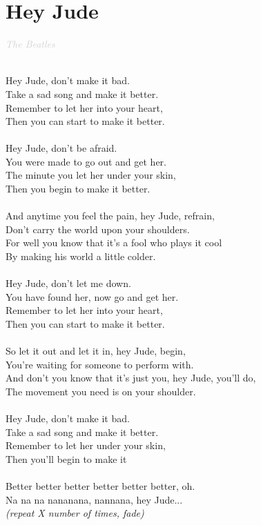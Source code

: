 \documentclass[a5paper, 10pt]{book}
\begin{document}
\section{Hey Jude}\textcolor{lightgray}{\textit{The Beatles}}\\~\\
\begin{minipage}[t]{0.8\textwidth}
Hey Jude, don't make it bad.\\
Take a sad song and make it better.\\
Remember to let her into your heart,\\
Then you can start to make it better.\\
\\
Hey Jude, don't be afraid.\\
You were made to go out and get her.\\
The minute you let her under your skin,\\
Then you begin to make it better.\\
\\
\hspace*{4mm}And anytime you feel the pain, hey Jude, refrain,\\
\hspace*{4mm}Don't carry the world upon your shoulders.\\
\hspace*{4mm}For well you know that it's a fool who plays it cool\\
\hspace*{4mm}By making his world a little colder.\\
\\
Hey Jude, don't let me down.\\
You have found her, now go and get her.\\
Remember to let her into your heart,\\
Then you can start to make it better.\\
\\
\hspace*{4mm}So let it out and let it in, hey Jude, begin,\\
\hspace*{4mm}You're waiting for someone to perform with.\\
\hspace*{4mm}And don't you know that it's just you, hey Jude, you'll do,\\
\hspace*{4mm}The movement you need is on your shoulder.\\
\\
Hey Jude, don't make it bad.\\
Take a sad song and make it better.\\
Remember to let her under your skin,\\
Then you'll begin to make it\\
\\
Better better better better better better, oh.\\
Na na na nananana, nannana, hey Jude...\\
\hspace*{23mm}\textit{\footnotesize(repeat X number of times, fade)}\\
\end{minipage}
\end{document}
